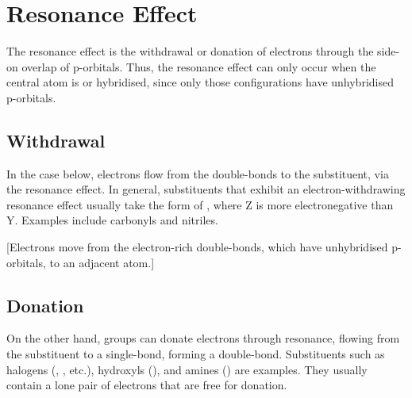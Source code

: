 	\section{Resonance Effect}

		The resonance effect is the withdrawal or donation of electrons through the side-on overlap of  p-orbitals.
		Thus, the resonance effect can only occur when the central atom is \spone{} or \sptwo{} hybridised, since only those
		configurations have unhybridised p-orbitals.


		\subsection{Withdrawal}

			In the case below, electrons flow from the double-bonds to the substituent, via the resonance effect. In general, substituents
			that exhibit an electron-withdrawing resonance effect usually take the form of , where Z is more electronegative than Y.
			Examples include carbonyls and nitriles.

			[Electrons move from the electron-rich double-bonds, which have unhybridised p-orbitals, to an adjacent atom.]



		\pagebreak
		\subsection{Donation}

			On the other hand, groups can donate electrons through resonance, flowing from the substituent to a single-bond, forming
			a double-bond. Substituents such as halogens (, \ch{\Cl}, etc.), hydroxyls (), and amines ()
			are examples. They usually contain a lone pair of electrons that are free for donation.


